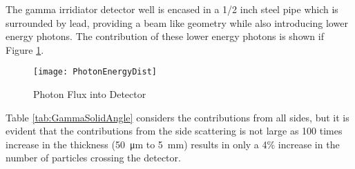 \documentclass[draftcls,onecolumn]{IEEEtran}
\begin{document}
The gamma irridiator detector well is encased in a 1/2 inch steel pipe which is surrounded by lead, providing a beam like geometry while also introducing lower energy photons. 
The contribution of these lower energy photons is shown if Figure \ref{fig:PhotonFluxAllEnergies}.
\begin{figure}
  \texttt{[image: PhotonEnergyDist]}
	\caption{Photon Flux into Detector}
  \label{fig:PhotonFluxAllEnergies}
\end{figure}
Table \ref{tab:GammaSolidAngle} considers the contributions from all sides, but it is evident that the contributions from the side scattering is not large as 100 times increase in the thickness (\SI{50}{\um} to \SI{5}{\mm}) results in only a 4\% increase in the number of particles crossing the detector.

\pagebreak
\end{document}
